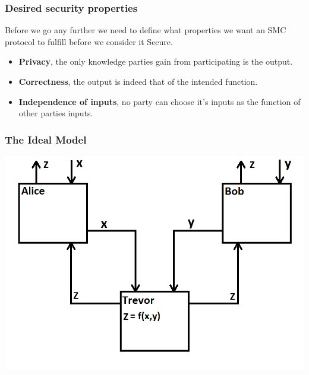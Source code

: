 \documentclass{beamer}
\begin{document}
	\begin{frame}
		\frametitle{Desired security properties}

		Before we go any further we need to define what properties we want an SMC protocol to fulfill before we consider it Secure.
		
		\begin{itemize}
			\item \textbf{Privacy}, the only knowledge parties gain from participating is the output.
			\item \textbf{Correctness}, the output is indeed that of the intended function.
			\item \textbf{Independence of inputs}, no party can choose it's inputs as the function of other parties inputs.
		\end{itemize}

	\end{frame}


	\begin{frame}
		\frametitle{The Ideal Model}

		\includegraphics[scale=0.6]{Images/IdealModel}
	\end{frame}
\end{document}
